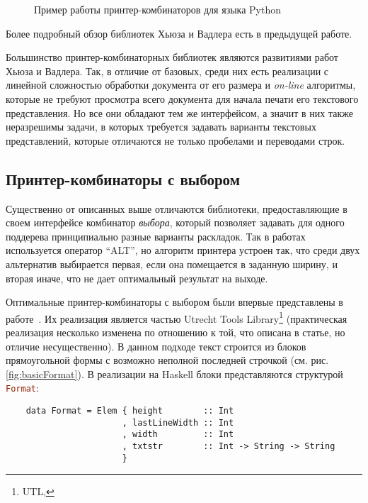 \begin{figure}[h!]
	\centering
	\null\hfill
	\null\hfill
	\hfill\null
	\caption{Пример работы принтер-комбинаторов для языка Python}
  \label{fig:seqEx}	
\end{figure}

Более подробный обзор библиотек Хьюза и Вадлера есть в предыдущей работе\cite{myCoursePaper}.

Большинство принтер-комбинаторных библиотек\cite{
swierstraChitil, swierstra04, peytonJones, kiselyov, chitil}
являются развитиями работ Хьюза и Вадлера. Так, в отличие от базовых, среди
них есть реализации с линейной сложностью обработки документа от его размера и
\emph{on-line} алгоритмы, которые не требуют просмотра всего документа
для начала печати его текстового представления. Но все они обладают тем же
интерфейсом, а значит в них также неразрешимы задачи, в которых требуется
задавать варианты текстовых представлений, которые отличаются не только
пробелами и переводами строк.

\subsection{Принтер-комбинаторы с выбором}

Существенно от описанных выше отличаются библиотеки, предоставляющие в своем
интерфейсе комбинатор \emph{выбора}, который позволяет задавать для одного поддерева
принципиально разные варианты раскладок.
Так в работах~\cite{jongeEveryOccasion, jongeReengine} используется оператор ``ALT'',
но алгоритм принтера устроен так, что среди двух альтернатив выбирается первая, если она
помещается в заданную ширину, и вторая иначе, что не дает оптимальный результат на выходе.

Оптимальные принтер-комбинаторы с выбором были впервые представлены в работе~\cite{swierstra}.
Их реализация является частью Utrecht Tools Library\footnote{
UTL, } (практическая реализация несколько изменена по
отношению к той, что описана в статье, но отличие несущественно).
В данном подходе текст строится из блоков прямоугольной формы с возможно неполной последней
строчкой (см. рис. \ref{fig:basicFormat}). В реализации на Haskell блоки представляются
структурой \lstinline[language = Haskell]{Format}:
\begin{lstlisting}
    data Format = Elem { height        :: Int
                       , lastLineWidth :: Int
                       , width         :: Int
                       , txtstr        :: Int -> String -> String
                       }
\end{lstlisting}

